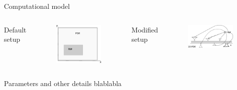 \documentclass[12pt,a4paper, xcolor={usenames,dvipsnames,svgnames,table}]{beamer}
\begin{document}
\begin{frame}[shrink]{Computational model}

\begin{columns}
Default setup
\begin{figure}[H]
 \centering
 \includegraphics[width=\textwidth]{../Figures/hybrid_model_principle.eps}
\end{figure}
Modified setup
\begin{figure}[H]
 \centering
 \includegraphics[width=\textwidth]{../Figures/dendrite_spine_model.eps}
\end{figure}
\end{columns}
\end{frame}
\notetoself{}


\begin{frame}[shrink]{Parameters and other details}
blablabla

\end{frame}
\notetoself{}
\end{document}
